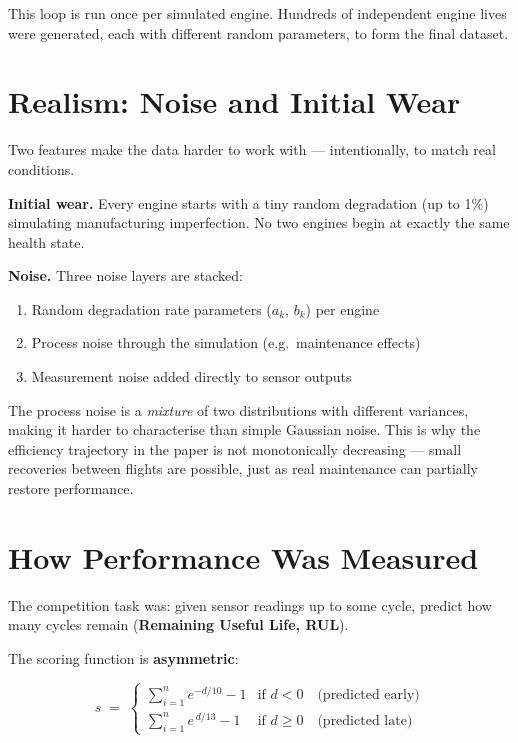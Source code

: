 \documentclass[11pt, a4paper]{article}
\begin{document}
This loop is run once per simulated engine. Hundreds of independent
engine lives were generated, each with different random parameters,
to form the final dataset.

\section{Realism: Noise and Initial Wear}

Two features make the data harder to work with --- intentionally,
to match real conditions.

\textbf{Initial wear.} Every engine starts with a tiny random degradation
(up to 1\%) simulating manufacturing imperfection. No two engines
begin at exactly the same health state.

\textbf{Noise.} Three noise layers are stacked:
\begin{enumerate}[noitemsep]
  \item Random degradation rate parameters ($a_k$, $b_k$) per engine
  \item Process noise through the simulation (e.g.\ maintenance effects)
  \item Measurement noise added directly to sensor outputs
\end{enumerate}

The process noise is a \emph{mixture} of two distributions with
different variances, making it harder to characterise than simple
Gaussian noise. This is why the efficiency trajectory in the paper
is not monotonically decreasing --- small recoveries between flights
are possible, just as real maintenance can partially restore performance.

\section{How Performance Was Measured}

The competition task was: given sensor readings up to some cycle,
predict how many cycles remain (\textbf{Remaining Useful Life, RUL}).

The scoring function is \textbf{asymmetric}:

\begin{equation}
  s \;=\; \begin{cases}
    \displaystyle\sum_{i=1}^{n} e^{-d/10} - 1
      & \text{if } d < 0 \quad \text{(predicted early)} \\[8pt]
    \displaystyle\sum_{i=1}^{n} e^{\,d/13} - 1
      & \text{if } d \geq 0 \quad \text{(predicted late)}
  \end{cases}
  \label{eq:score}
\end{equation}
\end{document}
